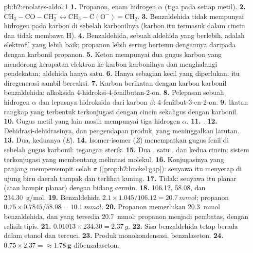 \begin{solution}{pb:b2:enolates-aldol:1}
\textbf{1.} Propanon, enam hidrogen $\alpha$ (tiga pada setiap metil).
\textbf{2.} $\mathrm{CH_3{-}CO{-}CH_2^-} \leftrightarrow \mathrm{CH_3{-}C(O^-){=}CH_2}$.
\textbf{3.} Benzaldehida tidak mempunyai hidrogen pada karbon di sebelah
karbonilnya (karbon itu termasuk dalam cincin dan tidak membawa H).
\textbf{4.} Benzaldehida, sebuah aldehida yang berlebih, adalah elektrofil
yang lebih baik;  propanon lebih sering bertemu dengannya daripada
dengan karbonil propanon.
\textbf{5.} Keton mempunyai dua gugus karbon yang mendorong kerapatan
elektron ke karbon karbonilnya dan menghalangi pendekatan; aldehida hanya
satu.
\textbf{6.} Hanya sebagian kecil  yang diperlukan:  itu
diregenerasi sambil bereaksi.
\textbf{7.} Karbon  berikatan dengan karbon karbonil benzaldehida:
alkoksida 4-hidroksi-4-fenilbutan-2-on.
\textbf{8.} Pelepasan sebuah hidrogen $\alpha$ dan lepasnya hidroksida dari karbon $\beta$: 4-fenilbut-3-en-2-on.
\textbf{9.} Ikatan rangkap yang terbentuk terkonjugasi dengan cincin sekaligus dengan karbonil.
\textbf{10.} Gugus metil yang lain masih mempunyai tiga hidrogen $\alpha$.
\textbf{11.} .
\textbf{12.} Dehidrasi-dehidrasinya, dan pengendapan produk, yang
meninggalkan larutan.
\textbf{13.} Dua, keduanya (\textit{E}).
\textbf{14.} Isomer-isomer (\textit{Z}) menempatkan gugus fenil di sebelah
gugus karbonil: tegangan sterik.
\textbf{15.} Dua , satu , dan kedua cincin: sistem
terkonjugasi yang membentang melintasi molekul.
\textbf{16.} Konjugasinya yang panjang mempersempit celah $\pi$ (\cref{prop:b2:huckel:gap}):
senyawa itu menyerap di ujung biru daerah tampak dan terlihat kuning.
\textbf{17.} Tidak: senyawa itu planar (atau hampir planar) dengan bidang cermin.
\textbf{18.} 106.12, 58.08, dan \qty{234.30}{g/mol}.
\textbf{19.} Benzaldehida $2.1 \times 1.045/106.12 = \qty{20.7}{mmol}$; propanon $0.75 \times
0.7845/58.08 = \qty{10.1}{mmol}$.
\textbf{20.} Propanon memerlukan \qty{20.3}{mmol} benzaldehida, dan yang
tersedia \qty{20.7}{mmol}: propanon menjadi pembatas, dengan selisih tipis.
\textbf{21.} $0.01013 \times 234.30 = \qty{2.37}{g}$.
\textbf{22.} Sisa benzaldehida tetap berada dalam etanol dan tercuci.
\textbf{23.} Produk monokondensasi, benzalaseton.
\textbf{24.} $0.75 \times 2.37 = \boldsymbol{\approx \qty{1.78}{g}}$ dibenzalaseton.
\end{solution}
